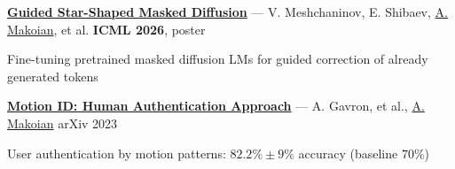 \href{https://arxiv.org/abs/2510.08369}{\textbf{Guided Star-Shaped Masked Diffusion}} --- V. Meshchaninov, E. Shibaev, \underline{A. Makoian}, et al. \hfill \textbf{ICML 2026}, poster\par\vspace{-.75em}
\begin{zitemize}
\item Fine-tuning pretrained masked diffusion LMs for guided correction of already generated tokens
\end{zitemize}
\href{https://arxiv.org/abs/2302.01751}{\textbf{Motion ID: Human Authentication Approach}} --- A. Gavron, et al., \underline{A. Makoian} \hfill arXiv 2023\par\vspace{-.75em}
\begin{zitemize}
\item User authentication by motion patterns: $82.2\% \pm 9\%$ accuracy (baseline $70\%$)
\end{zitemize}

